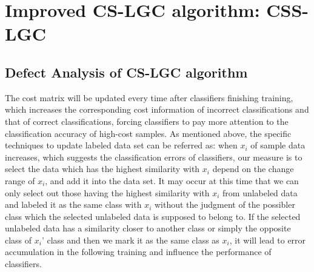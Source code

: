 \documentclass{svjour3}                     %
\begin{document}
\section{Improved CS-LGC algorithm: CSS-LGC}
\subsection{Defect Analysis of CS-LGC algorithm}

The cost matrix will be updated every time after classifiers finishing training, which increases the corresponding cost information of incorrect classifications and that of correct classifications, forcing classifiers to pay more attention to the classification accuracy of high-cost samples. As mentioned above, the specific techniques to update labeled data set can be referred as: when $x_i$ of sample data increases, which suggests the classification errors of classifiers, our measure is to select the data which has the highest similarity with $x_i$ depend on the change range of $x_i$, and add it into the data set. It may occur at this time that we can only select out those having the highest similarity with $x_i$ from unlabeled data and labeled it as the same class with $x_i$ without the judgment of the possibler class which the selected unlabeled data is supposed to belong to. If the selected unlabeled data has a similarity closer to another class or simply the opposite class of $x_i$' class and then we mark it as the same class as $x_i$, it will lead to error accumulation in the following training and influence the performance of classifiers.
\end{document}
